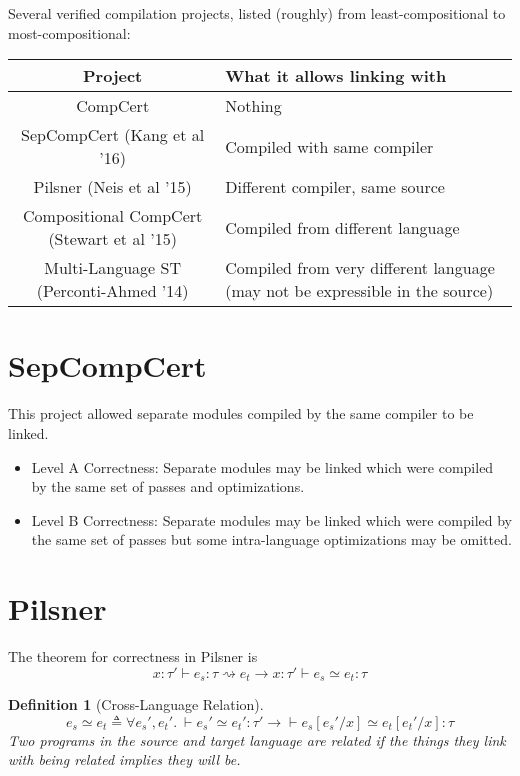 \documentclass[11pt]{article}
\newcommand{\todo}[1]{{\color{red} #1}}
\newcommand{\compile}{\rightsquigarrow}
\newcommand{\imp}{\ensuremath{\longrightarrow}}
\newtheorem{defn}{Definition}[section]
\begin{document}
Several verified compilation projects, listed (roughly) from
least-compositional to most-compositional:
\begin{tabular}{|c|p{4in}|}
  \hline
  \textbf{Project}  &  \textbf{What it allows linking with} \\
  \hline
  CompCert & Nothing \\
  \hline
  SepCompCert (Kang et al '16)  &  Compiled with same compiler \\
  \hline
  Pilsner (Neis et al '15)  &  Different compiler, same source \\
  \hline
  Compositional CompCert (Stewart et al '15)  &  Compiled from
  different language \\
  \hline
  Multi-Language ST (Perconti-Ahmed '14)  &  Compiled from very
  different language (may not be expressible in the source) \\
  \hline
\end{tabular}



\section{SepCompCert}
This project allowed separate modules compiled by the same compiler to
be linked.
\begin{itemize}
\item Level A Correctness:  Separate modules may be linked which were
  compiled by the same set of passes and optimizations.
\item Level B Correctness:  Separate modules may be linked which were
  compiled by the same set of passes but some intra-language
  optimizations may be omitted.
\end{itemize}



\section{Pilsner}
The theorem for correctness in Pilsner is
\[x:\tau' \vdash e_s : \tau \compile e_t  \imp
  x:\tau' \vdash e_s \simeq e_t : \tau \]

\begin{defn}[Cross-Language Relation]
  \[e_s \simeq e_t  \triangleq
    \forall e_s', e_t'.~ \vdash e_s' \simeq e_t' : \tau'  \imp
      \vdash e_s[e_s'/x] \simeq e_t[e_t'/x] : \tau \]
  Two programs in the source and target language are related if the
  things they link with being related implies they will be.
\end{defn}
\end{document}
